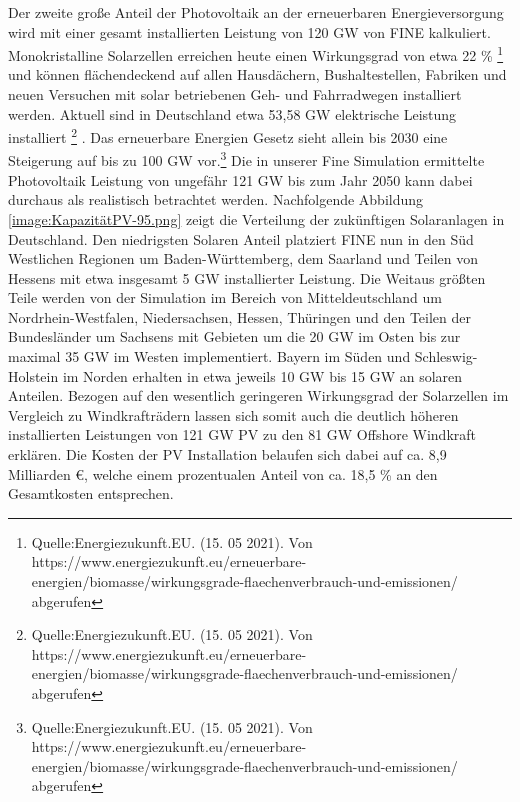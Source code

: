 Der zweite große Anteil der Photovoltaik an der erneuerbaren Energieversorgung wird mit einer gesamt installierten Leistung von 120 GW von FINE kalkuliert. Monokristalline Solarzellen erreichen heute einen Wirkungsgrad von etwa 22 \% \footnote{Quelle:Energiezukunft.EU. (15. 05 2021). Von https://www.energiezukunft.eu/erneuerbare-energien/biomasse/wirkungsgrade-flaechenverbrauch-und-emissionen/ abgerufen}  und können flächendeckend auf allen Hausdächern, Bushaltestellen, Fabriken und neuen Versuchen mit solar betriebenen Geh- und Fahrradwegen installiert werden. 
Aktuell sind in Deutschland etwa 53,58 GW elektrische Leistung installiert \footnote{Quelle:Energiezukunft.EU. (15. 05 2021). Von https://www.energiezukunft.eu/erneuerbare-energien/biomasse/wirkungsgrade-flaechenverbrauch-und-emissionen/ abgerufen} . Das erneuerbare Energien Gesetz sieht allein bis 2030 eine Steigerung auf bis zu 100 GW vor.\footnote{Quelle:Energiezukunft.EU. (15. 05 2021). Von https://www.energiezukunft.eu/erneuerbare-energien/biomasse/wirkungsgrade-flaechenverbrauch-und-emissionen/ abgerufen}  Die in unserer Fine Simulation ermittelte Photovoltaik Leistung von ungefähr 121 GW bis zum Jahr 2050 kann dabei durchaus als realistisch betrachtet werden. Nachfolgende Abbildung \ref{image:KapazitätPV-95.png} zeigt die Verteilung der zukünftigen Solaranlagen in Deutschland. 
Den niedrigsten Solaren Anteil platziert FINE nun in den Süd Westlichen Regionen um Baden-Württemberg, dem Saarland und Teilen von Hessens mit etwa insgesamt 5 GW installierter Leistung. Die Weitaus größten Teile werden von der Simulation im Bereich von Mitteldeutschland um Nordrhein-Westfalen, Niedersachsen, Hessen, Thüringen und den Teilen der Bundesländer um Sachsens mit Gebieten um die 20 GW im Osten bis zur maximal 35 GW im Westen implementiert. 
Bayern im Süden und Schleswig-Holstein im Norden erhalten in etwa jeweils 10 GW bis 15 GW an solaren Anteilen. Bezogen auf den wesentlich geringeren Wirkungsgrad der Solarzellen im Vergleich zu Windkrafträdern lassen sich somit auch die deutlich höheren installierten Leistungen von 121 GW PV zu den 81 GW Offshore Windkraft erklären. Die Kosten der PV Installation belaufen sich dabei auf ca. 8,9 Milliarden €, welche einem prozentualen Anteil von ca. 18,5  \% an den Gesamtkosten entsprechen.



